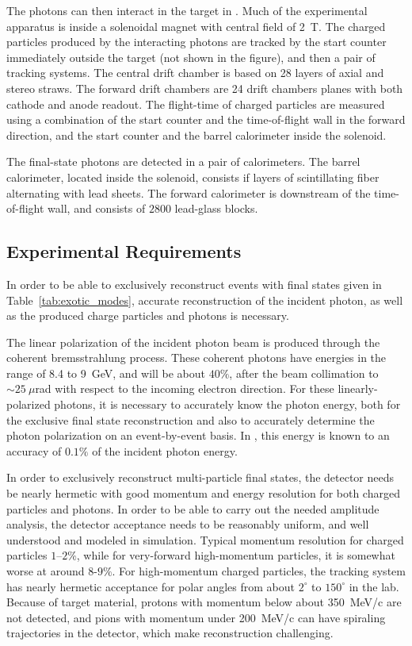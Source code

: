 The photons can then interact in the target in \GX{}. Much of the experimental apparatus is inside
a solenoidal magnet with central field of 2~T. The charged particles produced by the interacting
photons are tracked by the start counter immediately outside the target (not shown in the figure),
and then a pair of tracking systems. The central drift chamber is based on 28 layers of axial and stereo
straws. The forward drift chambers are 24 drift chambers planes with both cathode
and anode readout.  The flight-time of charged
particles are measured using a combination of the start counter and the time-of-flight wall in the forward
direction, and the start counter and the barrel calorimeter inside the solenoid.

The final-state photons are detected in a pair of calorimeters. The barrel calorimeter, located inside the 
solenoid, consists if layers of scintillating fiber alternating with lead sheets. The forward calorimeter
is downstream of the time-of-flight wall, and consists of $2800$ lead-glass blocks. 

\subsection[Experimental Requirements]{Experimental Requirements \label{sec:intro:requirements}}
In order to be able to exclusively reconstruct events with final states given in Table~\ref{tab:exotic_modes},
accurate reconstruction of the incident photon, as well as the produced charge particles and photons
is necessary. 

The linear polarization of the incident photon beam is produced through the coherent 
bremsstrahlung process. These coherent photons have energies in the range of 8.4 to 9~GeV,
and will be about $40\%$, after the beam collimation to $\sim{}25~\mu$rad with respect to the incoming 
electron direction. For these linearly-polarized photons, it is necessary to accurately know the photon 
energy, both for the exclusive final state reconstruction and also to accurately determine the photon 
polarization on an event-by-event basis. In \GX{}, this energy is known to an accuracy of $0.1\%$ of the
incident photon energy.

In order to exclusively reconstruct multi-particle final states, the \GX{} detector needs be nearly
hermetic with good momentum and energy resolution for both charged particles and photons.
In order to be able to carry out the needed amplitude analysis, the detector acceptance  needs to 
be reasonably uniform, and well understood and modeled in simulation. Typical momentum resolution
for charged particles $1$--$2\%$, while for very-forward high-momentum particles, it is somewhat
worse at around $8$-$9\%$. For high-momentum charged particles, the tracking system has 
nearly hermetic acceptance for polar angles from about $2^{\circ}$ to $150^{\circ}$ in the lab. 
Because of target material, protons with momentum below about 350~MeV/c are not detected,
and pions with momentum under 200~MeV/c can have spiraling trajectories in the detector,
which make reconstruction challenging.

